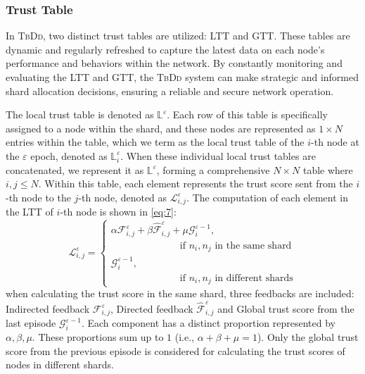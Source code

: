 \subsubsection{Trust Table}
In \textsc{TbDd}, two distinct trust tables are utilized: LTT and GTT. These tables are dynamic and regularly refreshed to capture the latest data on each node’s performance and behaviors within the network. By constantly monitoring and evaluating the LTT and GTT, the \textsc{TbDd} system can make strategic and informed shard allocation decisions, ensuring a reliable and secure network operation.


The local trust table is denoted as $\mathbb{L}^\varepsilon$. Each row of this table is specifically assigned to a node within the shard, and these nodes are represented as $1\times N$ entries within the table, which we term as the local trust table of the $i$-th node at the $\varepsilon$ epoch, denoted as $\mathbb{L}_{i}^\varepsilon$. When these individual local trust tables are concatenated, we represent it as $\mathbb{L}^\varepsilon$, forming a comprehensive $N \times N$ table where $i,j \leq N$. Within this table, each element represents the trust score sent from the $i$-th node to the $j$-th node, denoted as $\mathcal{L}_{i,j}^\varepsilon$. The computation of each element in the LTT of $i$-th node is shown in \eqref{eq:7}:
\begin{equation} 
\label{eq:7}
   \mathcal{L}_{i,j}^\varepsilon = \begin{cases}
    \alpha \mathcal{F}_{i,j}^\varepsilon + \beta \hat{\mathcal{F}}_{i,j}^\varepsilon + \mu 
    \mathcal{G}_{i}^{\varepsilon-1}, \\ \qquad\qquad\qquad\quad \text{if } n_i,n_j \text{ in the same shard}\\
    \mathcal{G}_{i}^{\varepsilon-1}, \\ \qquad\qquad\qquad\quad \text{if } n_i,n_j \text{ in different shards}
   \end{cases}
\end{equation}
\noindent when calculating the trust score in the same shard, three feedbacks are included: Indirected feedback $\mathcal{F}_{i,j}^\varepsilon$, Directed feedback $\hat{\mathcal{F}}_{i,j}^\varepsilon$ and Global trust score from the last episode $\mathcal{G}_{i}^{\varepsilon-1}$. Each component has a distinct proportion represented by $\alpha, \beta, \mu$. These proportions sum up to $1$ (i.e., $\alpha + \beta + \mu = 1$). Only the global trust score from the previous episode is considered for calculating the trust scores of nodes in different shards.


